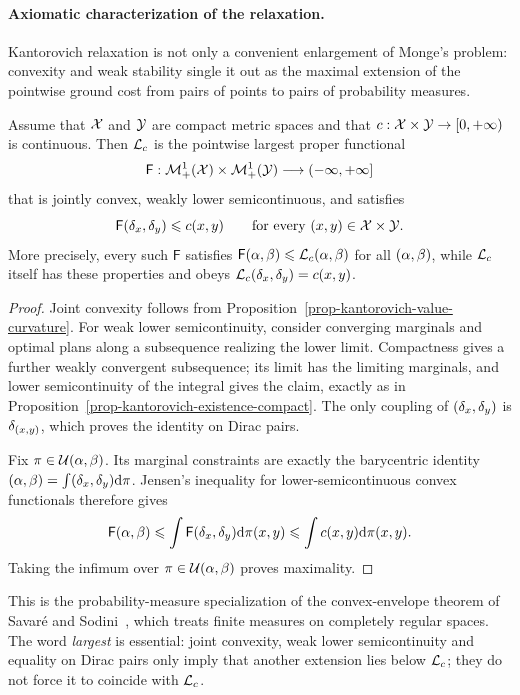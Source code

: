 \paragraph{Axiomatic characterization of the relaxation.}

Kantorovich relaxation is not only a convenient enlargement of Monge's problem: convexity and weak stability single it out as the maximal extension of the pointwise ground cost from pairs of points to pairs of probability measures.

\begin{thm}\label{thm-kantorovich-maximal-convex-relaxation}
	Assume that $\mathcal{X}$ and $\mathcal{Y}$ are compact metric spaces and that $c:\mathcal{X}\times\mathcal{Y}\to[0,+\infty)$ is continuous. Then $\mathcal{L}_c$ is the pointwise largest proper functional
	\[
		\mathsf F:\mathcal{M}_+^1(\mathcal{X})\times\mathcal{M}_+^1(\mathcal{Y})\longrightarrow(-\infty,+\infty]
	\]
	that is jointly convex, weakly lower semicontinuous, and satisfies
	\[
		\mathsf F(\delta_x,\delta_y)\leqslant c(x,y)
		\qquad\text{for every }(x,y)\in\mathcal{X}\times\mathcal{Y}.
	\]
	More precisely, every such $\mathsf F$ satisfies $\mathsf F(\alpha,\beta)\leqslant\mathcal{L}_c(\alpha,\beta)$ for all $(\alpha,\beta)$,
	while $\mathcal{L}_c$ itself has these properties and obeys $\mathcal{L}_c(\delta_x,\delta_y)=c(x,y)$.
\end{thm}
\begin{proof}
	Joint convexity follows from Proposition~\ref{prop-kantorovich-value-curvature}. For weak lower semicontinuity, consider converging marginals and optimal plans along a subsequence realizing the lower limit. Compactness gives a further weakly convergent subsequence; its limit has the limiting marginals, and lower semicontinuity of the integral gives the claim, exactly as in Proposition~\ref{prop-kantorovich-existence-compact}. The only coupling of $(\delta_x,\delta_y)$ is $\delta_{(x,y)}$, which proves the identity on Dirac pairs.

	Fix $\pi\in\mathcal{U}(\alpha,\beta)$. Its marginal constraints are exactly the barycentric identity $(\alpha,\beta)=\int(\delta_x,\delta_y)\mathrm{d}\pi$.
	Jensen's inequality for lower-semicontinuous convex functionals therefore gives
	\[
		\mathsf F(\alpha,\beta)
		\leqslant\int\mathsf F(\delta_x,\delta_y)\mathrm{d}\pi(x,y)
		\leqslant\int c(x,y)\mathrm{d}\pi(x,y).
	\]
	Taking the infimum over $\pi\in\mathcal{U}(\alpha,\beta)$ proves maximality.
\end{proof}

This is the probability-measure specialization of the convex-envelope theorem of Savar\'e and Sodini~\cite[Theorem~4.4]{SavareSodini2022}, which treats finite measures on completely regular spaces. The word \emph{largest} is essential: joint convexity, weak lower semicontinuity and equality on Dirac pairs only imply that another extension lies below $\mathcal{L}_c$; they do not force it to coincide with $\mathcal{L}_c$.


